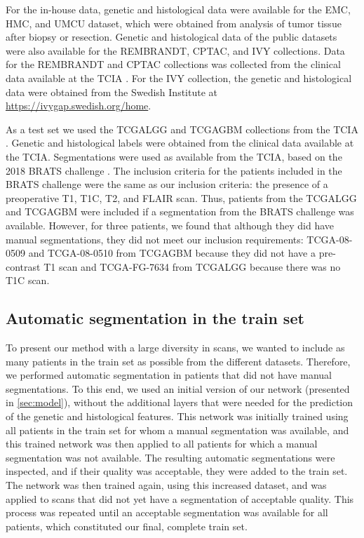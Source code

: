 For the in-house data, genetic and histological data were available for the \gls{EMC}, \gls{HMC}, and \gls{UMCU} dataset, which were obtained from analysis of \gls{tumor} tissue after biopsy or resection.
Genetic and histological data of the public datasets were also available for the \gls{REMBRANDT}, \gls{CPTAC}, and \gls{IVY} collections.
Data for the \gls{REMBRANDT} and  \gls{CPTAC} collections was collected from the clinical data available at the \gls{TCIA} \autocite{cptac2018radiology,scarpace2015radiology}.
For the \gls{IVY} collection, the genetic and histological data were obtained from the Swedish Institute at \url{https://ivygap.swedish.org/home}.

As a test set we used the \gls{TCGALGG} and \gls{TCGAGBM} collections from the \gls{TCIA} \autocite{pedano2016radiology, scarpace2016radiology}.
Genetic and histological labels were obtained from the clinical data available at the \gls{TCIA}.
Segmentations were used as available from the \gls{TCIA}, based on the 2018 \gls{BRATS} challenge \autocite{bakas2017brats, bakas2017segmentationLGG, bakas2017segmentationHGG}.
The inclusion criteria for the patients included in the \gls{BRATS} challenge were the same as our inclusion criteria: the presence of a preoperative \gls{T1}, \gls{T1C}, \gls{T2}, and \gls{FLAIR} scan.
Thus, patients from the \gls{TCGALGG} and \gls{TCGAGBM} were included  if a segmentation from the \gls{BRATS} challenge was available.
However, for three patients, we found that although they did have manual segmentations, they did not meet our inclusion requirements: TCGA-08-0509 and TCGA-08-0510 from \gls{TCGAGBM} because they did not have a pre-contrast \gls{T1} scan and TCGA-FG-7634 from \gls{TCGALGG} because there was no \gls{T1C} scan.

\subsection{Automatic segmentation in the train set}

To present our method with a large diversity in scans, we wanted to include as many patients in the train set as possible from the different datasets.
Therefore, we performed automatic segmentation in patients that did not have manual segmentations.
To this end, we used an initial version of our network (presented in \cref{sec:model}), without the additional layers that were needed for the prediction of the genetic and histological features.
This network was initially trained using all patients in the train set for whom a manual segmentation was available, and this trained network was then applied to all patients for which a manual segmentation was not available.
The resulting automatic segmentations were inspected, and if their quality was acceptable, they were added to the train set.
The network was then trained again, using this increased dataset, and was applied to scans that did not yet have a segmentation of acceptable quality.
This process was repeated until an acceptable segmentation was available for all patients, which constituted our final, complete train set.

